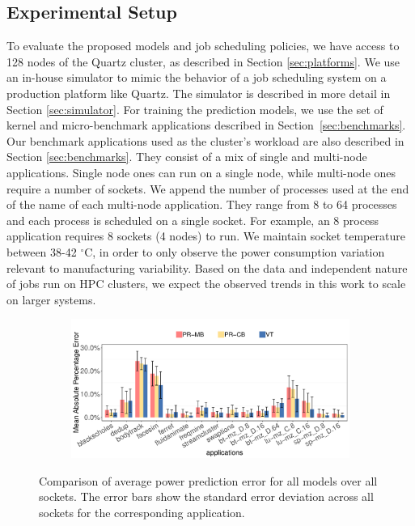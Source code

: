 
\subsection{Experimental Setup}
\label{sec:experimental_setup}
To evaluate the proposed models and job scheduling policies, we have access to 128 nodes
of the Quartz cluster, as described in Section \ref{sec:platforms}.  We use an in-house
simulator to mimic the behavior of a job scheduling system on a production platform like
Quartz.  The simulator is described in more detail in Section \ref{sec:simulator}. 
For training the prediction models, we use the set of kernel and micro-benchmark
applications described in Section~\ref{sec:benchmarks}.  Our benchmark applications used 
as the cluster's workload are also described in Section \ref{sec:benchmarks}.  They
consist of a mix of single and multi-node applications.  Single node ones can run on a
single node, while multi-node ones require a number of sockets.  We append the number of
processes used at the end of the name of each multi-node application.  They range from 8
to 64 processes and each process is scheduled on a single socket.  For example, an 8 process
application requires 8 sockets (4 nodes) to run.  We maintain socket temperature
between 38-42 $^\circ$C, in order to only observe the power consumption variation relevant
to manufacturing variability.  Based on the data and independent nature of jobs run on HPC
clusters, we expect the observed trends in this work to scale on larger systems. 

\begin{figure}[t!]
	\centering
	\begin{subfigure}[b]{.9\columnwidth}
		\includegraphics[width=\textwidth]{power_aware_job_scheduling/figures/model_power_pred_error}
	\end{subfigure}%
	\caption{Comparison of average power prediction error for all models over all sockets.
The error bars show the standard error deviation across all sockets for the corresponding
application.}
	\label{fig:model_power_pred_error}
\end{figure}

